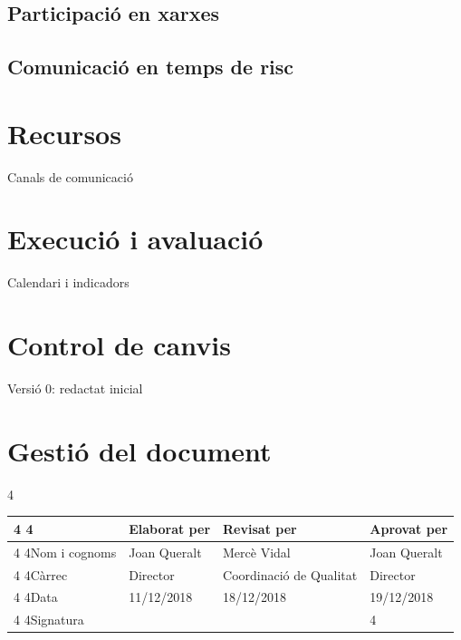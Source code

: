 \documentclass[fontsize=10pt,%
 4paper=a4,%
 4%
 4%
 4DIV=14,%
 4twoside,%
 4pagesize=auto,%
 4%
 4parskip=half,
 4%
 4captions=tableheading,%
 4numbers=noenddot,%
 4toc=graduated%
 4%
]{scrartcl}
\begin{document}
\subsection{Participació en xarxes}

\subsection{Comunicació en temps de risc}

\section{Recursos}\label{sec:recursos}

Canals de comunicació

\section{Execució i avaluació}\label{sec:execiaval}

Calendari i indicadors



\section{Control de canvis}

Versió 0: redactat inicial

\section{Gestió del document}\label{sec:gestiodoc}


\begin{center}\scriptsize{}\renewcommand{\arraystretch}{1.75}%
 4\begin{tabular}{lllp{4cm}}\hline
 4 4              & Elaborat per & Revisat per             & Aprovat per  \\ \hline
 4 4Nom i cognoms & Joan Queralt & Mercè Vidal             & Joan Queralt \\
 4 4Càrrec        & Director     & Coordinació de Qualitat & Director     \\
 4 4Data          & 11/12/2018   & 18/12/2018              & 19/12/2018   \\\hline
 4 4Signatura     &              &                         &              
 4\end{tabular}
\end{center}
\end{document}
